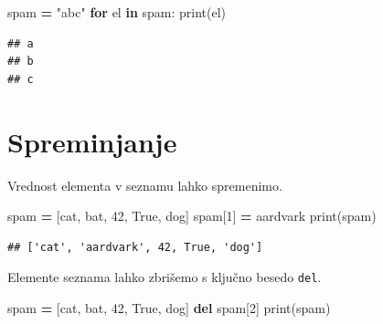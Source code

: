\documentclass[
]{book}
\newenvironment{Shaded}{\begin{snugshade}}{\end{snugshade}}
\newcommand{\BuiltInTok}[1]{#1}
\newcommand{\ControlFlowTok}[1]{\textcolor[rgb]{0.13,0.29,0.53}{\textbf{#1}}}
\newcommand{\DecValTok}[1]{\textcolor[rgb]{0.00,0.00,0.81}{#1}}
\newcommand{\KeywordTok}[1]{\textcolor[rgb]{0.13,0.29,0.53}{\textbf{#1}}}
\newcommand{\NormalTok}[1]{#1}
\newcommand{\OperatorTok}[1]{\textcolor[rgb]{0.81,0.36,0.00}{\textbf{#1}}}
\newcommand{\StringTok}[1]{\textcolor[rgb]{0.31,0.60,0.02}{#1}}
\newcommand{\VariableTok}[1]{\textcolor[rgb]{0.00,0.00,0.00}{#1}}
\begin{document}
\begin{Shaded}
\begin{Highlighting}[]
\NormalTok{spam }\OperatorTok{=} \StringTok{"abc"}
\ControlFlowTok{for}\NormalTok{ el }\KeywordTok{in}\NormalTok{ spam:}
    \BuiltInTok{print}\NormalTok{(el)}
\end{Highlighting}
\end{Shaded}

\begin{verbatim}
## a
## b
## c
\end{verbatim}

\hypertarget{spreminjanje}{%
\section{Spreminjanje}\label{spreminjanje}}

Vrednost elementa v seznamu lahko spremenimo.

\begin{Shaded}
\begin{Highlighting}[]
\NormalTok{spam }\OperatorTok{=}\NormalTok{ [}\StringTok{\textquotesingle{}cat\textquotesingle{}}\NormalTok{, }\StringTok{\textquotesingle{}bat\textquotesingle{}}\NormalTok{, }\DecValTok{42}\NormalTok{, }\VariableTok{True}\NormalTok{, }\StringTok{\textquotesingle{}dog\textquotesingle{}}\NormalTok{]}
\NormalTok{spam[}\DecValTok{1}\NormalTok{] }\OperatorTok{=} \StringTok{\textquotesingle{}aardvark\textquotesingle{}}
\BuiltInTok{print}\NormalTok{(spam)}
\end{Highlighting}
\end{Shaded}

\begin{verbatim}
## ['cat', 'aardvark', 42, True, 'dog']
\end{verbatim}

Elemente seznama lahko zbrišemo s ključno besedo \texttt{del}.

\begin{Shaded}
\begin{Highlighting}[]
\NormalTok{spam }\OperatorTok{=}\NormalTok{ [}\StringTok{\textquotesingle{}cat\textquotesingle{}}\NormalTok{, }\StringTok{\textquotesingle{}bat\textquotesingle{}}\NormalTok{, }\DecValTok{42}\NormalTok{, }\VariableTok{True}\NormalTok{, }\StringTok{\textquotesingle{}dog\textquotesingle{}}\NormalTok{]}
\KeywordTok{del}\NormalTok{ spam[}\DecValTok{2}\NormalTok{]}
\BuiltInTok{print}\NormalTok{(spam)}
\end{Highlighting}
\end{Shaded}
\end{document}
